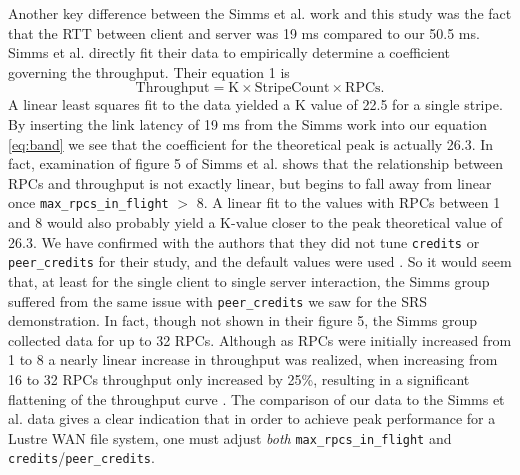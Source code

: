 \documentclass[]{sig-alternate}
\begin{document}
Another key difference between the Simms et al. work and this study was the fact
that the RTT between client and server was 19 ms compared to our 50.5 ms. Simms et al. directly fit their data
to empirically determine a coefficient governing the throughput. Their equation 1 is
\begin{equation}
\mathrm{Throughput = K \times Stripe Count \times RPCs.}
\end{equation}
A linear least squares fit to the data yielded a K value of 22.5 for a single stripe. By inserting the link
latency of 19 ms from the Simms work into our equation \ref{eq:band} we see that the coefficient for the
theoretical peak is actually 26.3. In fact, examination of figure 5 of Simms et al. \cite{simms2007} shows
that the relationship between RPCs and throughput is not exactly linear, but begins to fall away from linear
once {\tt max\_rpcs\_in\_flight} $>$ 8. A linear fit to the values with RPCs between 1 and 8 would also
probably yield a K-value closer to the peak theoretical value of 26.3. We have confirmed with the
authors that they did not tune {\tt credits} or {\tt peer\_credits} for their study, and the default values
were used \cite{simmsprivate}. So it would seem that, at least for the single client to single server
interaction, the Simms group suffered from the same issue with {\tt peer\_credits} we saw for the SRS
demonstration. In fact, though not shown in their figure 5, the Simms group collected data for up to 32
RPCs. Although as RPCs were initially increased from 1 to 8 a nearly linear increase in throughput was
realized, when increasing from 16 to 32 RPCs throughput only increased by 25\%, resulting in a significant
flattening of the throughput curve \cite{simmsprivate}. The comparison of our data to the Simms et al. data
gives a clear indication that in order to achieve peak performance for a Lustre WAN file system, one must adjust {\it both} {\tt max\_rpcs\_in\_flight} and {\tt credits}/{\tt peer\_credits}.
\end{document}
